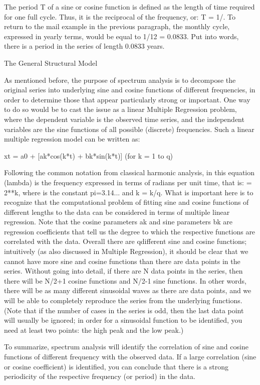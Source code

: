 The period T of a sine or cosine function is defined as the length of time required for one full cycle. Thus, it is the reciprocal of the frequency, or: T = 1/. To return to the mail example in the previous paragraph, the monthly cycle, expressed in yearly terms, would be equal to 1/12 = 0.0833. Put into words, there is a period in the series of length 0.0833 years.

The General Structural Model

As mentioned before, the purpose of spectrum analysis is to decompose the original series into underlying sine and cosine functions of different frequencies, in order to determine those that appear particularly strong or important. One way to do so would be to cast the issue as a linear Multiple Regression problem, where the dependent variable is the observed time series, and the independent variables are the sine functions of all possible (discrete) frequencies. Such a linear multiple regression model can be written as:

xt = a0 +  [ak*cos(k*t) + bk*sin(k*t)]    (for k = 1 to q)

Following the common notation from classical harmonic analysis, in this equation  (lambda) is the frequency expressed in terms of radians per unit time, that is:  = 2**k, where  is the constant pi=3.14... and k = k/q. What is important here is to recognize that the computational problem of fitting sine and cosine functions of different lengths to the data can be considered in terms of multiple linear regression. Note that the cosine parameters ak and sine parameters bk are regression coefficients that tell us the degree to which the respective functions are correlated with the data. Overall there are qdifferent sine and cosine functions; intuitively (as also discussed in Multiple Regression), it should be clear that we cannot have more sine and cosine functions than there are data points in the series. Without going into detail, if there are N data points in the series, then there will be N/2+1 cosine functions and N/2-1 sine functions. In other words, there will be as many different sinusoidal waves as there are data points, and we will be able to completely reproduce the series from the underlying functions. (Note that if the number of cases in the series is odd, then the last data point will usually be ignored; in order for a sinusoidal function to be identified, you need at least two points: the high peak and the low peak.)

To summarize, spectrum analysis will identify the correlation of sine and cosine functions of different frequency with the observed data. If a large correlation (sine or cosine coefficient) is identified, you can conclude that there is a strong periodicity of the respective frequency (or period) in the data.

